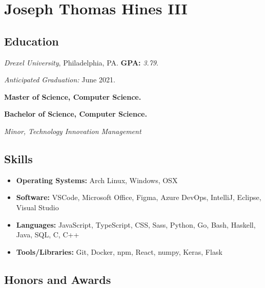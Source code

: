 \documentclass[10pt]{article}
\begin{document}
\section*{\huge Joseph Thomas Hines III}
\label{sec:title}

\begin{multicols}{2}
\setlength\multicolsep{0pt}

\subsection*{Education}%
\label{sub:Education}

\vspace{-\topsep}
\emph{Drexel University}, Philadelphia, PA. \textbf{GPA:} \emph{3.79}.

\emph{Anticipated Graduation:} June 2021.

\vspace{0.2em}

\textbf{Master of Science, Computer Science.}

\textbf{Bachelor of Science, Computer Science.}

\emph{Minor, Technology Innovation Management}

\vspace{-\topsep}
\subsection*{Skills}%
\label{sub:Skills}

\vspace{-\topsep}
\begin{itemize}[leftmargin=*,noitemsep,topsep=0pt]
\item \textbf{Operating Systems:} Arch Linux, Windows, OSX
\item \textbf{Software:} VSCode, Microsoft Office, Figma, Azure DevOps,
	IntelliJ, Eclipse, Visual Studio
\item \textbf{Languages:} JavaScript, TypeScript, CSS, Sass, Python, Go,
	Bash, Haskell, Java, SQL, C, C++
\item \textbf{Tools/Libraries:} Git, Docker, npm, React, numpy, Keras, Flask
\end{itemize}

\vfill\null
\columnbreak

\subsection*{Honors and Awards}%
\label{sub:Honors and Awards}


\end{multicols}
\end{document}
